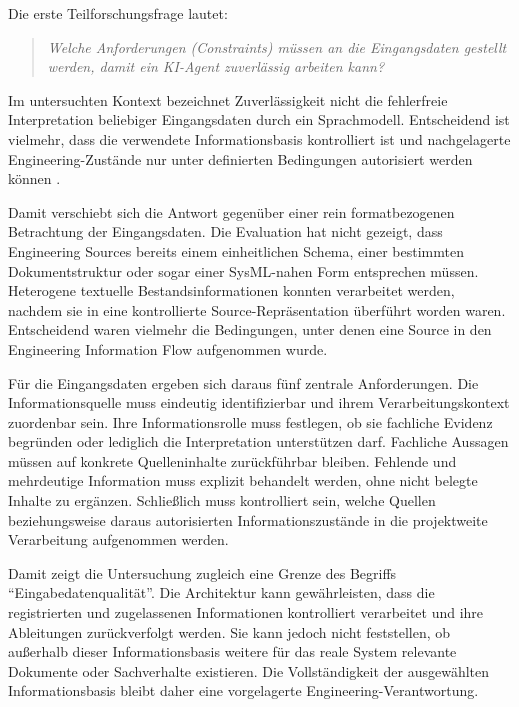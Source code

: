 Die erste Teilforschungsfrage lautet:

\begin{quote}
\textit{Welche Anforderungen (Constraints) müssen an die Eingangsdaten gestellt
werden, damit ein KI-Agent zuverlässig arbeiten kann?}
\end{quote}

Im untersuchten Kontext bezeichnet Zuverlässigkeit nicht die fehlerfreie
Interpretation beliebiger Eingangsdaten durch ein Sprachmodell. Entscheidend
ist vielmehr, dass die verwendete Informationsbasis kontrolliert ist und
nachgelagerte Engineering-Zustände nur unter definierten Bedingungen
autorisiert werden können
\cite{Topcu2025,Barke2023,Sergeyuk2025}.

Damit verschiebt sich die Antwort gegenüber einer rein formatbezogenen
Betrachtung der Eingangsdaten. Die Evaluation hat nicht gezeigt, dass
Engineering Sources bereits einem einheitlichen Schema, einer bestimmten
Dokumentstruktur oder sogar einer SysML-nahen Form entsprechen müssen.
Heterogene textuelle Bestandsinformationen konnten verarbeitet werden, nachdem
sie in eine kontrollierte Source-Repräsentation überführt worden waren.
Entscheidend waren vielmehr die Bedingungen, unter denen eine Source in den
Engineering Information Flow aufgenommen wurde.

Für die Eingangsdaten ergeben sich daraus fünf zentrale Anforderungen. Die
Informationsquelle muss eindeutig identifizierbar und ihrem
Verarbeitungskontext zuordenbar sein. Ihre Informationsrolle muss festlegen,
ob sie fachliche Evidenz begründen oder lediglich die Interpretation
unterstützen darf. Fachliche Aussagen müssen auf konkrete Quelleninhalte
zurückführbar bleiben. Fehlende und mehrdeutige Information muss explizit
behandelt werden, ohne nicht belegte Inhalte zu ergänzen. Schließlich muss
kontrolliert sein, welche Quellen beziehungsweise daraus autorisierten
Informationszustände in die projektweite Verarbeitung aufgenommen werden.

Damit zeigt die Untersuchung zugleich eine Grenze des Begriffs
``Eingabedatenqualität''. Die Architektur kann gewährleisten, dass die
registrierten und zugelassenen Informationen kontrolliert verarbeitet und
ihre Ableitungen zurückverfolgt werden. Sie kann jedoch nicht feststellen,
ob außerhalb dieser Informationsbasis weitere für das reale System relevante
Dokumente oder Sachverhalte existieren. Die Vollständigkeit der ausgewählten
Informationsbasis bleibt daher eine vorgelagerte Engineering-Verantwortung.

